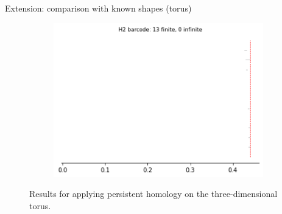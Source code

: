 \documentclass[xcolor={dvipsnames,svgnames}]{beamer}
\begin{document}
\begin{frame}{Extension: comparison with known shapes (torus)}
\begin{figure}[H]
\begin{subfigure}[b]{0.2\textwidth}
\includegraphics[width=\textwidth]{figures/torus_H2_barcode.png}
 \caption{}
\end{subfigure}
\caption{\scriptsize Results for applying persistent homology on the three-dimensional torus.}
\end{figure}
\end{frame}
\end{document}
